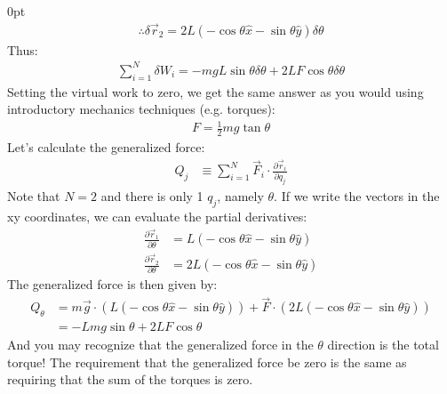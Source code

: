 \begin{example}{0pt}
\begin{align*}
\therefore \delta\vec{r}_2=2L(-\cos{\theta}\hat{x}-\sin{\theta}\hat{y})\delta\theta
\end{align*}
Thus:
\begin{align*}
\sum_{i=1}^N\delta W_i = -mgL\sin{\theta}\delta\theta+ 2LF\cos{\theta}\delta\theta
\end{align*}
Setting the virtual work to zero, we get the same answer as you would using introductory mechanics techniques (e.g. torques):
\begin{align*}
F=\frac{1}{2}mg\tan{\theta}
\end{align*}
Let's calculate the generalized force:
\begin{align*}
Q_j&\equiv \sum_{i=1}^N\vec{F}_i\cdot\frac{\partial\vec{r}_i}{\partial q_j}\nonumber
\end{align*}
Note that $N=2$ and there is only 1 $q_j$, namely $\theta$. If we write the vectors in the xy coordinates, we can evaluate the partial derivatives:
\begin{align*}
\frac{\partial\vec{r}_1}{\partial \theta}&=L(-\cos{\theta}\hat{x}-\sin{\theta}\hat{y}) \\
\frac{\partial\vec{r}_2}{\partial \theta}&=2L(-\cos{\theta}\hat{x}-\sin{\theta}\hat{y})
\end{align*}
The generalized force is then given by:
\begin{align*}
Q_\theta&=m\vec{g}\cdot\left(L(-\cos{\theta}\hat{x}-\sin{\theta}\hat{y})\right)+\vec{F}\cdot\left(2L(-\cos{\theta}\hat{x}-\sin{\theta}\hat{y})\right)\\
&=-Lmg\sin{\theta}+2LF\cos{\theta}
\end{align*}
And you may recognize that the generalized force in the $\theta$ direction is the total torque! The requirement that the generalized force be zero is the same as requiring that the sum of the torques is zero.
\end{example}

